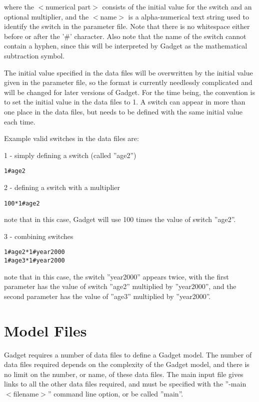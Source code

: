 \documentclass [a4paper, 10pt]{book}
\begin{document}
where the $<$numerical part$>$ consists of the initial value for the switch and an optional multiplier, and the $<$name$>$ is a alpha-numerical text string used to identify the switch in the parameter file.  Note that there is no whitespace either before or after the '\#' character.  Also note that the name of the switch cannot contain a hyphen, since this will be interpreted by Gadget as the mathematical subtraction symbol.

\bigskip
The initial value specified in the data files will be overwritten by the initial value given in the parameter file, so the format is currently needlessly complicated and will be changed for later versions of Gadget.  For the time being, the convention is to set the initial value in the data files to 1.  A switch can appear in more than one place in the data files, but needs to be defined with the same initial value each time.

\bigskip
Example valid switches in the data files are:\newline

1 - simply defining a switch (called ''age2'')
{\small\begin{verbatim}
1#age2
\end{verbatim}}

2 - defining a switch with a multiplier
{\small\begin{verbatim}
100*1#age2
\end{verbatim}}
note that in this case, Gadget will use 100 times the value of switch ''age2''.\newline

3 - combining switches
{\small\begin{verbatim}
1#age2*1#year2000
1#age3*1#year2000
\end{verbatim}}
note that in this case, the switch ''year2000'' appears twice, with the first parameter has the value of switch ''age2'' multiplied by ''year2000'', and the second parameter has the value of ''age3'' multiplied by ''year2000''.

\chapter{Model Files}\label{chap:model}
Gadget requires a number of data files to define a Gadget model.  The number of data files required depends on the complexity of the Gadget model, and there is no limit on the number, or name, of these data files.  The main input file gives links to all the other data files required, and must be specified with the ''-main $<$filename$>$'' command line option, or be called ''main''.
\end{document}
